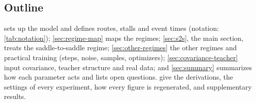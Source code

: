 \subsection{Outline}\label{sec:intro-outline}

 sets up the model and defines routes, stalls and event times (notation:
\cref{tab:notation}); \cref{sec:regime-map} maps the regimes; \cref{sec:s2s}, the main section, treats
the saddle-to-saddle regime; \cref{sec:other-regimes} the other regimes and practical training (steps,
noise, samples, optimizers); \cref{sec:covariance-teacher} input covariance, teacher structure and real
data; and \cref{sec:summary} summarizes how each parameter acts and lists open questions.
 give the derivations, the settings of
every experiment, how every figure is regenerated, and supplementary results.
